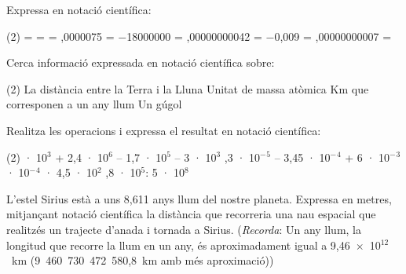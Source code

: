 \begin{mylist}

\exer \spen Expressa en notació científica:
\begin{tasks}(2)
 =     =  
 =    ,0000075 =
\task  $-$18000000 =     ,00000000042 =
\task  $-$0,009 =    ,00000000007 =
\end{tasks}

\exer  \simbolsearch Cerca informació expressada en notació científica sobre:
\begin{tasks}(2)
\task  La distància entre la Terra i la Lluna  \task  Unitat de massa atòmica
\task  Km que corresponen a un any llum  \task  Un gúgol   
\end{tasks}


\exer[1]  Realitza les operacions i expressa el resultat en notació científica:
\begin{tasks}(2)
 · 10${}^{3}$ + 2,4 · 10${}^{6}$ -- 1,7 · 10${}^{5}$ -- 3 · 10${}^{3}$ ,3 · 10${}^{-}$${}^{5}$ -- 3,45 · 10${}^{-}$${}^{4}$ + 6 · 10${}^{-}$${}^{3}$
 · 10${}^{-}$${}^{4}$ · 4,5 · 10${}^{2 }$   ,8 · 10${}^{5}$: 5 · 10${}^{8}$
\end{tasks}


\exer[1]  L'estel Sirius està a uns 8,611 anys llum del nostre planeta. Expressa en metres, mitjançant notació científica la distància que recorreria una nau espacial que realitzés un trajecte d'anada i tornada a Sirius. (\textit{Recorda}: Un any llum, la longitud que recorre la llum en un any, és aproximadament igual a  9,46~$\times$~10${}^{12}$~km (9~460~730~472~580,8~km amb més aproximació))

 


\end{mylist}
